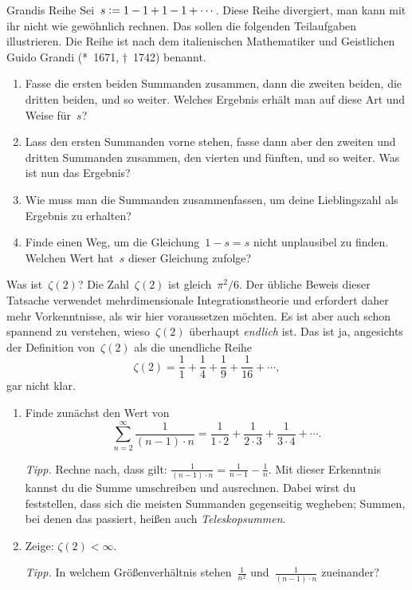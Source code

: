 \documentclass[twoside]{../zirkelblatt1415}
\theoremstyle{definition}
\theoremstyle{plain}
\theoremstyle{remark}
\newcommand{\defeq}{\vcentcolon=}
\begin{document}
\begin{aufgabe}{Grandis Reihe}\label{aufg:grandi}
Sei~$s \defeq 1 - 1 + 1 - 1 + \cdots$. Diese Reihe divergiert, man kann mit ihr
nicht wie gewöhnlich rechnen. Das sollen die folgenden Teilaufgaben
illustrieren. Die Reihe ist nach dem italienischen Mathematiker und
Geistlichen Guido Grandi (*~1671, †~1742) benannt.
\begin{enumerate}
\item Fasse die ersten beiden Summanden zusammen, dann die zweiten beiden, die
dritten beiden, und so weiter. Welches Ergebnis erhält man auf diese Art und
Weise für~$s$?
\item Lass den ersten Summanden vorne stehen, fasse dann aber den zweiten und
dritten Summanden zusammen, den vierten und fünften, und so weiter. Was
ist nun das Ergebnis?
\item Wie muss man die Summanden zusammenfassen, um deine Lieblingszahl als
Ergebnis zu erhalten?
\item Finde einen Weg, um die Gleichung~$1 - s = s$ nicht unplausibel zu
finden. Welchen Wert hat~$s$ dieser Gleichung zufolge?
\end{enumerate}\fixlistspacing
\end{aufgabe}

\begin{aufgabe}{Was ist~$\zeta(2)$?}\label{aufg:zeta2}
Die Zahl~$\zeta(2)$ ist gleich~$\pi^2/6$. Der übliche Beweis dieser Tatsache
verwendet mehrdimensionale Integrationstheorie und erfordert daher mehr
Vorkenntnisse, als wir hier voraussetzen möchten. Es ist aber auch schon spannend
zu verstehen, wieso~$\zeta(2)$ überhaupt \emph{endlich} ist. Das ist ja,
angesichts der Definition von~$\zeta(2)$ als die unendliche Reihe
\[ \zeta(2) = \frac{1}{1} + \frac{1}{4} + \frac{1}{9} + \frac{1}{16} + \cdots,
\]
gar nicht klar.
\begin{enumerate}
\item Finde zunächst den Wert von
\[ \sum_{n=2}^\infty \frac{1}{(n-1) \cdot n} =
  \frac{1}{1 \cdot 2} + \frac{1}{2 \cdot 3} + \frac{1}{3 \cdot 4} + \cdots. \]

\emph{Tipp.} Rechne nach, dass gilt: $\frac{1}{(n-1) \cdot n} = \frac{1}{n-1} -
\frac{1}{n}$. Mit dieser Erkenntnis kannst du die Summe umschreiben und
ausrechnen. Dabei wirst du feststellen, dass sich die meisten Summanden
gegenseitig wegheben; Summen, bei denen das passiert, heißen auch
\emph{Teleskopsummen}.

\item Zeige: $\zeta(2) < \infty$.

\emph{Tipp.} In welchem Größenverhältnis stehen~$\frac{1}{n^2}$
und~$\frac{1}{(n-1) \cdot n}$ zueinander?
\end{enumerate}\fixlistspacing
\end{aufgabe}
\end{document}
